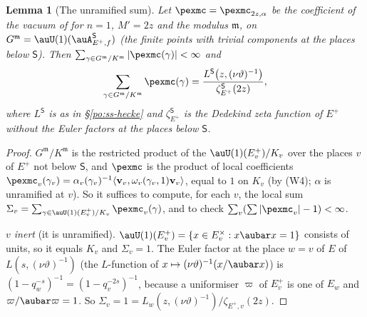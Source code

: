 \documentclass[10pt]{amsart}
\newtheorem{lemma}[theorem]{Lemma}
\theoremstyle{definition}
\theoremstyle{remark}
\providecommand{\psvac}{\mathbf v}
\begin{document}
\begin{lemma}[The unramified sum]\label{pex:vac}
Let $\pexmc=\pexmc_{2z,\alpha}$ be the coefficient of the vacuum of {\cite[\S2.3]{P53}} for $n=1$,
$M'=2z$ and the modulus $\mathfrak m$, on $G^{\mathfrak m}=\auU(1)(\auA^{\mathsf S}_{E^+,f})$ (the finite
points with trivial components at the places below $\mathsf S$). Then $\sum_{\gamma\in G^{\mathfrak
m}/K^{\mathfrak m}}|\pexmc(\gamma)|<\infty$ and
\[
\sum_{\gamma\in G^{\mathfrak m}/K^{\mathfrak m}}\pexmc(\gamma)=\frac{L^{\mathsf S}\bigl(z,(\nu\vartheta)^{-1}
\bigr)}{\zeta^{\mathsf S}_{E^+}(2z)},
\]
where $L^{\mathsf S}$ is as in \S\ref{po:ss-hecke} and $\zeta^{\mathsf S}_{E^+}$ is the Dedekind zeta
function of $E^+$ without the Euler factors at the places below $\mathsf S$.
\end{lemma}
\begin{proof}
$G^{\mathfrak m}/K^{\mathfrak m}$ is the restricted product of the $\auU(1)(E^+_v)/K_v$ over the
places $v$ of $E^+$ not below $\mathsf S$, and $\pexmc$ is the product of local coefficients
$\pexmc_v(\gamma_v)=\alpha_v(\gamma_v)^{-1}\langle\psvac_v,\omega_v(\gamma_v,1)\psvac_v\rangle$, equal to
$1$ on $K_v$ (by (W4); $\alpha$ is unramified at $v$). So it suffices to compute, for each $v$, the
local sum $\Sigma_v=\sum_{\gamma\in\auU(1)(E^+_v)/K_v}\pexmc_v(\gamma)$, and to check
$\sum_v(\sum|\pexmc_v|-1)<\infty$.

\emph{$v$ inert} (it is unramified). $\auU(1)(E^+_v)=\{x\in E_v^\times:x\aubar x=1\}$ consists of
units, so it equals $K_v$ and $\Sigma_v=1$. The Euler factor at the place $w=v$ of $E$ of
$L(s,(\nu\vartheta)^{-1})$ (the $L$-function of $x\mapsto(\nu\vartheta)^{-1}(x/\aubar x)$) is
$(1-q_w^{-s})^{-1}=(1-q_v^{-2s})^{-1}$, because a uniformiser $\varpi$ of $E^+_v$ is one of $E_w$
and $\varpi/\aubar\varpi=1$. So $\Sigma_v=1=L_w(z,(\nu\vartheta)^{-1})/\zeta_{E^+,v}(2z)$.


\end{proof}
\end{document}
